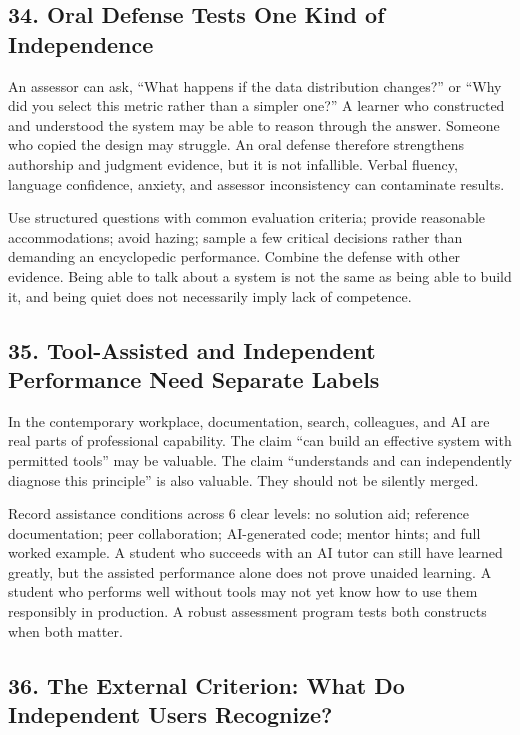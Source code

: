 \subsection*{34. Oral Defense Tests One Kind of Independence}

An assessor can ask, ``What happens if the data distribution changes?'' or ``Why did you select this metric rather than a simpler one?'' A learner who constructed and understood the system may be able to reason through the answer. Someone who copied the design may struggle. An oral defense therefore strengthens authorship and judgment evidence, but it is not infallible. Verbal fluency, language confidence, anxiety, and assessor inconsistency can contaminate results.

Use structured questions with common evaluation criteria; provide reasonable accommodations; avoid hazing; sample a few critical decisions rather than demanding an encyclopedic performance. Combine the defense with other evidence. Being able to talk about a system is not the same as being able to build it, and being quiet does not necessarily imply lack of competence.

\subsection*{35. Tool-Assisted and Independent Performance Need Separate Labels}

In the contemporary workplace, documentation, search, colleagues, and AI are real parts of professional capability. The claim ``can build an effective system with permitted tools'' may be valuable. The claim ``understands and can independently diagnose this principle'' is also valuable. They should not be silently merged.

Record assistance conditions across 6 clear levels: no solution aid; reference documentation; peer collaboration; AI-generated code; mentor hints; and full worked example. A student who succeeds with an AI tutor can still have learned greatly, but the assisted performance alone does not prove unaided learning. A student who performs well without tools may not yet know how to use them responsibly in production. A robust assessment program tests both constructs when both matter.

\subsection*{36. The External Criterion: What Do Independent Users Recognize?}

